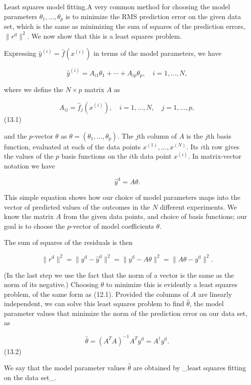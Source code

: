 
Least squares model fitting.A very common method for choosing the model parameters \(\theta_{1},\ldots,\theta_{p}\) is to minimize the RMS prediction error on the given data set, which is the same as minimizing the sum of squares of the prediction errors, \(\|r^{\mathrm{d}}\|^{2}\). We now show that this is a least squares problem.

Expressing \(\hat{y}^{(i)}=\hat{f}(x^{(i)})\) in terms of the model parameters, we have

\[\hat{y}^{(i)}=A_{i1}\theta_{1}+\cdots+A_{ip}\theta_{p},\quad i=1,\ldots,N,\]

where we define the \(N\times p\) matrix \(A\) as

\[A_{ij}=\hat{f}_{j}(x^{(i)}),\quad i=1,\ldots,N,\quad j=1,\ldots,p,\] (13.1)

and the \(p\)-vector \(\theta\) as \(\theta=(\theta_{1},\ldots,\theta_{p})\). The \(j\)th column of \(A\) is the \(j\)th basis function, evaluated at each of the data points \(x^{(1)},\ldots,x^{(N)}\). Its \(i\)th row gives the values of the \(p\) basis functions on the \(i\)th data point \(x^{(i)}\). In matrix-vector notation we have

\[\hat{y}^{\mathrm{d}}=A\theta.\]

This simple equation shows how our choice of model parameters maps into the vector of predicted values of the outcomes in the \(N\) different experiments. We know the matrix \(A\) from the given data points, and choice of basis functions; our goal is to choose the \(p\)-vector of model coefficients \(\theta\).

The sum of squares of the residuals is then

\[\|r^{\mathrm{d}}\|^{2}=\|y^{\mathrm{d}}-\hat{y}^{\mathrm{d}}\|^{2}=\|y^{ \mathrm{d}}-A\theta\|^{2}=\|A\theta-y^{\mathrm{d}}\|^{2}.\]

(In the last step we use the fact that the norm of a vector is the same as the norm of its negative.) Choosing \(\theta\) to minimize this is evidently a least squares problem, of the same form as (12.1). Provided the columns of \(A\) are linearly independent, we can solve this least squares problem to find \(\hat{\theta}\), the model parameter values that minimize the norm of the prediction error on our data set, as

\[\hat{\theta}=(A^{T}A)^{-1}A^{T}y^{\mathrm{d}}=A^{\dagger}y^{\mathrm{d}}.\] (13.2)

We say that the model parameter values \(\hat{\theta}\) are obtained by _least squares fitting on the data set_.


